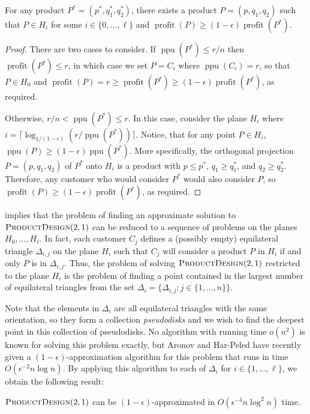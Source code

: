 \documentclass[lotsofwhite]{patmorin}
\newcommand{\ppu}{\operatorname{ppu}}
\newcommand{\val}{\operatorname{profit}}
\begin{document}
\begin{lem}
  For any product $P^*=(p^*,q_1^*,q_2^*)$, there exists a product
  $P=(p,q_1,q_2)$ such that $P\in H_i$ for some $i\in\{0,\ldots,\ell\}$
  and $\val(P) \ge (1-\epsilon)\val(P^*)$.
\end{lem}

\begin{proof}
  There are two cases to consider.  If $\ppu(P^*) \le r/n$ then $\val(P^*)
  \le r$, in which case we set $P=C_i$ where $\ppu(C_i) = r$, so that
  $P\in H_0$ and $\val(P) = r \ge \val(P^*)\ge (1-\epsilon)\val(P^*)$,
  as required.

  Otherwise, $r/n < \ppu(P^*) \le r$.  In this case, consider
  the plane $H_i$ where $i = \lceil\log_{1/(1-\epsilon)}
  (r/\ppu(P^*))\rceil$.  Notice, that for any point $P\in H_i$, $\ppu(P)
  \ge (1-\epsilon)\ppu(P^*)$.  More specifically, the orthogonal
  projection $P=(p,q_1,q_2)$ of $P^*$ onto $H_i$ is a product with $p\le
  p^*$, $q_1\ge q_1^*$, and $q_2\ge q_2^*$.  Therefore, any customer
  who would consider $P^*$ would also consider $P$, so $\val(P) \ge
  (1-\epsilon)\val(P^*)$, as required.
\end{proof}

 implies that the problem of finding an
approximate solution to  $\textsc{ProductDesign}(2,1)$ can be reduced
to a sequence of problems on the planes $H_0,\ldots,H_\ell$.  In fact,
each customer $C_j$ defines a (possibly empty) equilateral triangle
$\Delta_{i,j}$ on the plane $H_i$ such that $C_j$ will consider a
product $P$ in $H_i$ if and only $P$ is in $\Delta_{i,j}$.  Thus, the
problem of solving $\textsc{ProductDesign}(2,1)$ restricted to the
plane $H_i$ is the problem of finding a point contained in the largest
number of equilateral triangles from the set $\Delta_i=\{\Delta_{i,j}:
j\in\{1,\ldots,n\}\}$.

Note that the elements in $\Delta_i$ are all equilateral triangles
with the same orientation, so they form a collection
\emph{pseudodisks} and we wish to find the deepest point in this
collection of pseudodisks.  No algorithm with running time $o(n^2)$ is
known for solving this problem exactly, but Aronov and Har-Peled have
recently given a $(1-\epsilon)$-approximation algorithm for this
problem that runs in time $O(\epsilon^{-2}n\log n)$.  By applying this
algorithm to each of $\Delta_i$ for $i\in\{1,\ldots,\ell\}$, we obtain
the following result:

\begin{thm}
  $\textsc{ProductDesign}(2,1)$ can be $(1-\epsilon)$-approximated in
  $O(\epsilon^{-3}n\log^2 n)$ time.
\end{thm}
\end{document}
